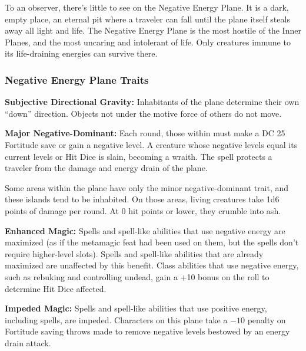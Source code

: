To an observer, there's little to see on the Negative Energy Plane. It is a dark, empty place, an eternal pit where a traveler can fall until the plane itself steals away all light and life. The Negative Energy Plane is the most hostile of the Inner Planes, and the most uncaring and intolerant of life. Only creatures immune to its life-draining energies can survive there.

\subsubsection{Negative Energy Plane Traits}
\begin{itemize*}
\item \textbf{Subjective Directional Gravity:} Inhabitants of the plane determine their own ``down'' direction. Objects not under the motive force of others do not move.
\item \textbf{Major Negative-Dominant:} Each round, those within must make a DC 25 Fortitude save or gain a negative level. A creature whose negative levels equal its current levels or Hit Dice is slain, becoming a wraith. The  spell protects a traveler from the damage and energy drain of the plane.

Some areas within the plane have only the minor negative-dominant trait, and these islands tend to be inhabited. On those areas, living creatures take 1d6 points of damage per round. At 0 hit points or lower, they crumble into ash.
\item \textbf{Enhanced Magic:} Spells and spell-like abilities that use negative energy are maximized (as if the  metamagic feat had been used on them, but the spells don't require higher-level slots). Spells and spell-like abilities that are already maximized are unaffected by this benefit. Class abilities that use negative energy, such as rebuking and controlling undead, gain a +10 bonus on the roll to determine Hit Dice affected.
\item \textbf{Impeded Magic:} Spells and spell-like abilities that use positive energy, including  spells, are impeded. Characters on this plane take a $-10$ penalty on Fortitude saving throws made to remove negative levels bestowed by an energy drain attack.
\end{itemize*}
